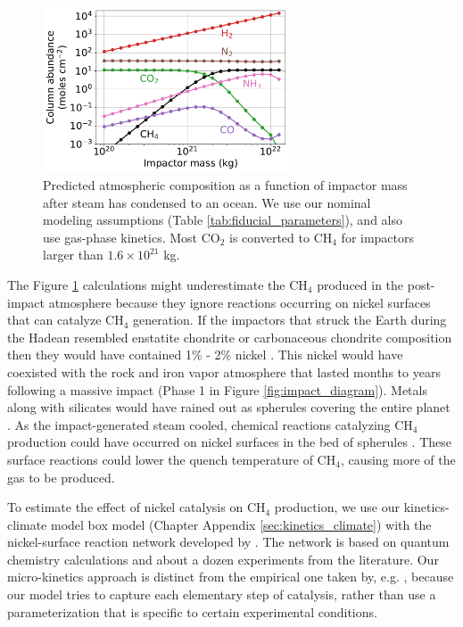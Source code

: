 \begin{figure}
  \centering
  \includegraphics[width=0.65\textwidth]{tex/5impacts/figures/Figure2.pdf}
  \caption{Predicted atmospheric composition as a function of impactor mass after steam has condensed to an ocean. We use our nominal modeling assumptions (Table \ref{tab:fiducial_parameters}), and also use gas-phase kinetics. Most CO$_2$ is converted to CH$_4$ for impactors larger than $1.6 \times 10^{21}$ kg.}
  \label{fig:figure2}
\end{figure}

The Figure \ref{fig:figure2} calculations might underestimate the CH$_4$ produced in the post-impact atmosphere because they ignore reactions occurring on nickel surfaces that can catalyze CH$_4$ generation. If the impactors that struck the Earth during the Hadean resembled enstatite chondrite or carbonaceous chondrite composition then they would have contained 1\% - 2\% nickel \citep[Table 15]{Lewis_1992}. This nickel would have coexisted with the rock and iron vapor atmosphere that lasted months to years following a massive impact (Phase 1 in Figure \ref{fig:impact_diagram}). Metals along with silicates would have rained out as spherules covering the entire planet \citep{Genda_2017}. As the impact-generated steam cooled, chemical reactions catalyzing CH$_4$ production could have occurred on nickel surfaces in the bed of spherules \citep{Schmider_2021}. These surface reactions could lower the quench temperature of CH$_4$, causing more of the gas to be produced.

To estimate the effect of nickel catalysis on CH$_4$ production, we use our kinetics-climate model box model (Chapter Appendix \ref{sec:kinetics_climate}) with the nickel-surface reaction network developed by \citet{Schmider_2021}. The network is based on quantum chemistry calculations and about a dozen experiments from the literature. Our micro-kinetics approach is distinct from the empirical one taken by, e.g. \citet{Kress_2004}, because our model tries to capture each elementary step of catalysis, rather than use a parameterization that is specific to certain experimental conditions. 

